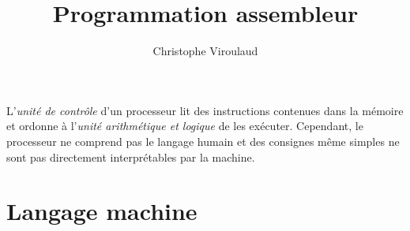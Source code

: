 \documentclass[svgnames,11pt]{beamer}
\author[]{Christophe Viroulaud}
\title{Programmation assembleur}
\date{\framebox{\textbf{ArchMat 02}}}
\institute{Première - NSI}
\begin{document}
\begin{frame}
    \titlepage
\end{frame}
\begin{frame}
    \frametitle{}

    L'\emph{unité de contrôle} d'un processeur lit des instructions contenues dans la mémoire et ordonne à l'\emph{unité arithmétique et logique} de les exécuter. Cependant, le processeur ne comprend pas le langage humain et des consignes même simples ne sont pas directement interprétables par la machine.

\end{frame}
\begin{frame}
    \frametitle{}

    \begin{center}
    \end{center}

\end{frame}
\section{Langage machine}
\end{document}
